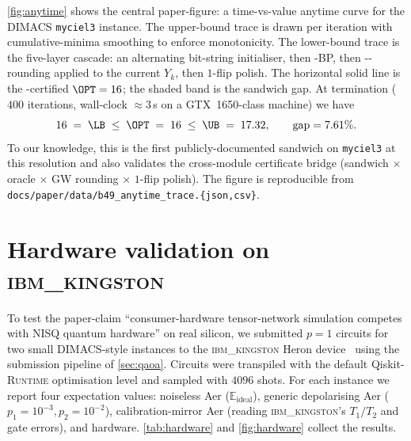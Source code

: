 \documentclass{article}
\begin{document}
\cref{fig:anytime} shows the central paper-figure: a time-vs-value
anytime curve for the DIMACS \texttt{myciel3} instance. The upper-bound
trace is drawn per \FW iteration with cumulative-minima smoothing to
enforce monotonicity. The lower-bound trace is the five-layer cascade:
an alternating bit-string initialiser, then \MPQS-BP, then
\FW-\GW-rounding applied to the current $Y_k$, then $1$-flip polish.
The horizontal solid line is the \ILP-certified $\OPT = 16$; the shaded
band is the sandwich gap. At termination ($400$ iterations,
wall-clock $\approx 3$\,s on a GTX~1650-class machine) we have
\begin{equation}
  16 \;=\; \LB \;\le\; \OPT \;=\; 16 \;\le\; \UB \;=\; 17.32,
  \qquad \text{gap} = 7.61\%.
\end{equation}
To our knowledge, this is the first publicly-documented sandwich on \texttt{myciel3} at
this resolution and also validates the cross-module certificate bridge
(\FW sandwich $\times$ \ILP oracle $\times$ GW rounding $\times$ $1$-flip
polish). The figure is reproducible from
\texttt{docs/paper/data/b49\_anytime\_trace.\{json,csv\}}.

\section{Hardware validation on \textsc{ibm\_kingston}}
\label{sec:hardware}

To test the paper-claim ``consumer-hardware tensor-network simulation
competes with NISQ quantum hardware'' on real silicon, we submitted
$p{=}1$ \QAOA circuits for two small DIMACS-style instances to the
\textsc{ibm\_kingston} Heron device~\cite{qiskit2024,qiskitruntime2024}
using the submission pipeline of \cref{sec:qaoa}. Circuits were
transpiled with the default Qiskit-\textsc{Runtime} optimisation
level and sampled with $4096$ shots. For each instance we report four
expectation values: noiseless Aer ($\mathbb{E}_{\text{ideal}}$),
generic depolarising Aer ($p_1 = 10^{-3}, p_2 = 10^{-2}$),
calibration-mirror Aer (reading \textsc{ibm\_kingston}'s $T_1/T_2$
and gate errors), and hardware. \cref{tab:hardware} and
\cref{fig:hardware} collect the results.
\end{document}
